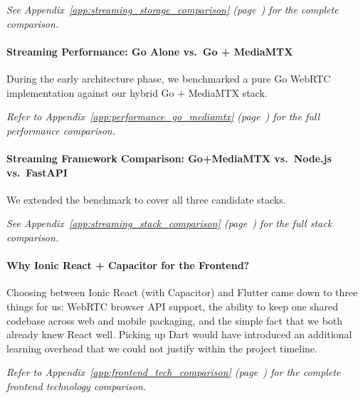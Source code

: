 \documentclass[12pt,a4paper,oneside]{report}
\begin{document}
\hspace{0.8cm}\textit{See Appendix~\ref{app:streaming_storage_comparison} (page~\pageref{app:streaming_storage_comparison}) for the complete comparison.}

\paragraph{Streaming Performance: Go Alone vs.\ Go + MediaMTX}

\hspace{0.8cm}During the early architecture phase, we benchmarked a pure Go WebRTC implementation against our hybrid Go + MediaMTX stack.

\hspace{0.8cm}\textit{Refer to Appendix~\ref{app:performance_go_mediamtx} (page~\pageref{app:performance_go_mediamtx}) for the full performance comparison.}

\paragraph{Streaming Framework Comparison: Go+MediaMTX vs.\ Node.js vs.\ FastAPI}

\hspace{0.8cm}We extended the benchmark to cover all three candidate stacks.

\hspace{0.8cm}\textit{See Appendix~\ref{app:streaming_stack_comparison} (page~\pageref{app:streaming_stack_comparison}) for the full stack comparison.}

\paragraph{Why Ionic React + Capacitor for the Frontend?}

\hspace{0.8cm}Choosing between Ionic React (with Capacitor) and Flutter came down to three things for us: WebRTC browser API support, the ability to keep one shared codebase across web and mobile packaging, and the simple fact that we both already knew React well. Picking up Dart would have introduced an additional learning overhead that we could not justify within the project timeline.

\hspace{0.8cm}\textit{Refer to Appendix~\ref{app:frontend_tech_comparison} (page~\pageref{app:frontend_tech_comparison}) for the complete frontend technology comparison.}
\end{document}
